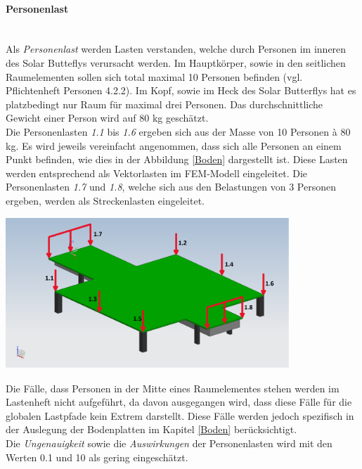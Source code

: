\paragraph{Personenlast}\mbox{}\\
Als \emph{Personenlast} werden Lasten verstanden, welche durch Personen im inneren des Solar Butteflys verursacht werden. Im Hauptkörper, sowie in den seitlichen Raumelementen sollen sich total maximal 10 Personen befinden (vgl. Pflichtenheft Personen 4.2.2). Im Kopf, sowie im Heck des Solar Butterflys hat es platzbedingt nur Raum für maximal drei Personen. Das durchschnittliche Gewicht einer Person wird auf 80 kg geschätzt.\\
Die Personenlasten \emph{1.1} bis \emph{1.6} ergeben sich aus der Masse von 10 Personen à 80 kg. Es wird jeweils vereinfacht angenommen, dass sich alle Personen an einem Punkt befinden, wie dies in der Abbildung \ref{Boden} dargestellt ist. Diese Lasten werden entsprechend als Vektorlasten im FEM-Modell eingeleitet. Die Personenlasten \emph{1.7} und \emph{1.8}, welche sich aus den Belastungen von 3 Personen ergeben, werden als Streckenlasten eingeleitet.

\begin{center}
  \includegraphics[width=0.8\textwidth]{04_Figures/BodenMitLasten.png}
  \label{Boden}
\end{center}

Die Fälle, dass Personen in der Mitte eines Raumelementes stehen werden im Lastenheft nicht aufgeführt, da davon ausgegangen wird, dass diese Fälle für die globalen Lastpfade kein Extrem darstellt. Diese Fälle werden jedoch spezifisch in der Auslegung der Bodenplatten im Kapitel \ref{Boden} berücksichtigt.\\
Die \emph{Ungenauigkeit} sowie die \emph{Auswirkungen} der Personenlasten wird mit den Werten 0.1 und 10 als gering eingeschätzt.

